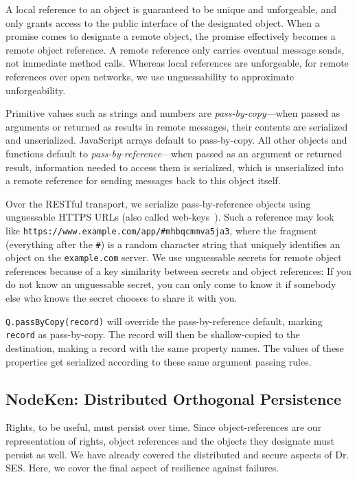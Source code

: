 \documentclass{llncs}
\begin{document}
A local reference to an object is guaranteed to be unique and unforgeable, and only grants access to the public interface of the designated object. When a promise comes to designate a remote object, the promise effectively becomes a remote object reference. A remote reference only carries eventual message sends, not immediate method calls. Whereas local references are unforgeable, for remote references over open networks, we use unguessability to approximate unforgeability.

Primitive values such as strings and numbers are \emph{pass-by-copy}---when passed as arguments or returned as results in remote messages, their contents are serialized and unserialized. JavaScript arrays default to pass-by-copy. All other objects and functions default to \emph{pass-by-reference}---when passed as an argument or returned result, information needed to access them is serialized, which is unserialized into a remote reference for sending messages back to this object itself.

Over the RESTful transport, we serialize pass-by-reference objects using unguessable HTTPS URLs (also called web-keys~\cite{Close:Webkeys}). Such a reference may look like {\tt https://www.example.com/app/\#mhbqcmmva5ja3}, where the fragment (everything after the {\tt \#}) is a random character string that uniquely identifies an object on the {\tt example.com} server. We use unguessable secrets for remote object references because of a key similarity between secrets and object references: If you do not know an unguessable secret, you can only come to know it if somebody else who knows the secret chooses to share it with you.

\begin{description*}
\item[{\tt Q.passByCopy(record)}] will override the pass-by-reference default, marking {\tt record} as pass-by-copy. The record will then be shallow-copied to the destination, making a record with the same property names. The values of these properties get serialized according to these same argument passing rules.
\end{description*}

\subsection{NodeKen: Distributed Orthogonal Persistence}
\label{NodeKen}

Rights, to be useful, must persist over time. Since object-references are our representation of rights, object references and the objects they designate must persist as well. We have already covered the distributed and secure aspects of Dr. SES. Here, we cover the final aspect of resilience against failures.
\end{document}
